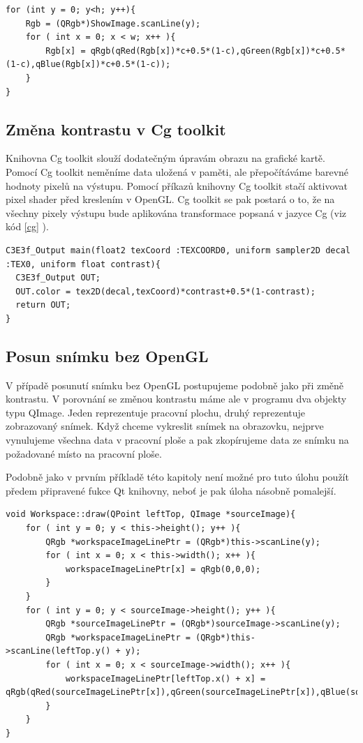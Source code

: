 \begin{lstlisting}[label=DicomImageClass,caption={Změna kontrastu bez použití knihovny Cg toolkit.}]
for (int y = 0; y<h; y++){
	Rgb = (QRgb*)ShowImage.scanLine(y);
	for ( int x = 0; x < w; x++ ){
		Rgb[x] = qRgb(qRed(Rgb[x])*c+0.5*(1-c),qGreen(Rgb[x])*c+0.5*(1-c),qBlue(Rgb[x])*c+0.5*(1-c));
	}
}
\end{lstlisting}

\subsection{Změna kontrastu v Cg toolkit}

Knihovna Cg toolkit slouží dodatečným úpravám obrazu na grafické kartě. Pomocí Cg toolkit neměníme data uložená v paměti, ale přepočítáváme barevné hodnoty pixelů na výstupu. Pomocí příkazů knihovny Cg toolkit stačí aktivovat pixel shader před kreslením v OpenGL. Cg toolkit se pak postará o to, že na všechny pixely výstupu bude aplikována transformace popsaná v jazyce Cg (viz kód \ref{cg} ).

\begin{lstlisting}[label=cg,caption={Program v jazyce Cg pro změnu kontrastu snímku.}]
C3E3f_Output main(float2 texCoord :TEXCOORD0, uniform sampler2D decal :TEX0, uniform float contrast){
  C3E3f_Output OUT;
  OUT.color = tex2D(decal,texCoord)*contrast+0.5*(1-contrast);
  return OUT;
}
\end{lstlisting}

\subsection{Posun snímku bez OpenGL}
V případě posunutí snímku bez OpenGL postupujeme podobně jako při změně kontrastu. V porovnání se změnou kontrastu máme ale v programu dva objekty typu QImage. Jeden reprezentuje pracovní plochu, druhý reprezentuje zobrazovaný snímek. Když chceme vykreslit snímek na obrazovku, nejprve vynulujeme všechna data v pracovní ploše a pak zkopírujeme data ze snímku na požadované místo na pracovní ploše.

Podobně jako v prvním příkladě této kapitoly není možné pro tuto úlohu použít předem připravené fukce Qt knihovny, neboť je pak úloha násobně pomalejší.

\begin{lstlisting}[caption={Funkce pro vykreslení snímku na zadanou pozici napsaná bez použití OpenGL.}]
void Workspace::draw(QPoint leftTop, QImage *sourceImage){
	for ( int y = 0; y < this->height(); y++ ){
		QRgb *workspaceImageLinePtr = (QRgb*)this->scanLine(y);
		for ( int x = 0; x < this->width(); x++ ){
			workspaceImageLinePtr[x] = qRgb(0,0,0);
		}
	}
	for ( int y = 0; y < sourceImage->height(); y++ ){
		QRgb *sourceImageLinePtr = (QRgb*)sourceImage->scanLine(y);
		QRgb *workspaceImageLinePtr = (QRgb*)this->scanLine(leftTop.y() + y);
		for ( int x = 0; x < sourceImage->width(); x++ ){
			workspaceImageLinePtr[leftTop.x() + x] = qRgb(qRed(sourceImageLinePtr[x]),qGreen(sourceImageLinePtr[x]),qBlue(sourceImageLinePtr[x]));
		}
	}
}
\end{lstlisting}


